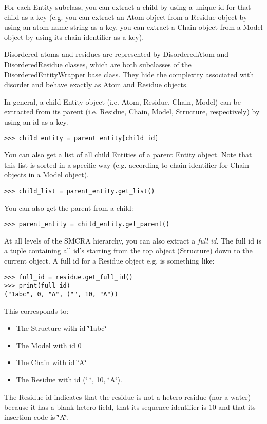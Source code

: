 For each Entity subclass, you can extract a child by using a unique id for that
child as a key (e.g. you can extract an Atom object from a Residue object by
using an atom name string as a key, you can extract a Chain object from a Model
object by using its chain identifier as a key).

Disordered atoms and residues are represented by DisorderedAtom and DisorderedResidue
classes, which are both subclasses of the DisorderedEntityWrapper base class.
They hide the complexity associated with disorder and behave exactly as Atom
and Residue objects.

In general, a child Entity object (i.e. Atom, Residue, Chain, Model) can be
extracted from its parent (i.e. Residue, Chain, Model, Structure, respectively)
by using an id as a key.

\begin{verbatim}
>>> child_entity = parent_entity[child_id]
\end{verbatim}

You can also get a list of all child Entities of a parent Entity object. Note
that this list is sorted in a specific way (e.g. according to chain identifier
for Chain objects in a Model object).

\begin{verbatim}
>>> child_list = parent_entity.get_list()
\end{verbatim}

You can also get the parent from a child:
\begin{verbatim}
>>> parent_entity = child_entity.get_parent()
\end{verbatim}

At all levels of the SMCRA hierarchy, you can also extract a \emph{full id}.
The full id is a tuple containing all id's starting from the top object (Structure)
down to the current object. A full id for a Residue object e.g. is something
like:

\begin{verbatim}
>>> full_id = residue.get_full_id()
>>> print(full_id)
("1abc", 0, "A", ("", 10, "A"))
\end{verbatim}

This corresponds to:

\begin{itemize}
\item The Structure with id \char`\"{}1abc\char`\"{}
\item The Model with id 0
\item The Chain with id \char`\"{}A\char`\"{}
\item The Residue with id (\char`\"{} \char`\"{}, 10, \char`\"{}A\char`\"{}).
\end{itemize}
The Residue id indicates that the residue is not a hetero-residue (nor a water)
because it has a blank hetero field, that its sequence identifier is 10 and
that its insertion code is \char`\"{}A\char`\"{}.

